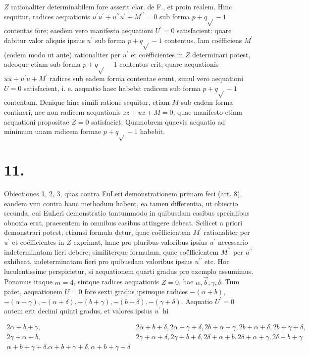 \documentclass[twoside,12pt, showframe]{memoir}
\begin{document}
\(Z\) rationaliter determinabilem fore asserit clar. de F., et proin realem. Hinc sequitur, radices aequationis \(u^{\prime} u^{\prime}+u^{\prime \prime} u^{\prime}+M^{\prime \prime}=0\) sub forma \(p+q \sqrt{ }-1\) contentas fore; eaedem vero manifesto aequationi \(U^{\prime}=0\) satisfacient: quare dabitur valor aliquis ipsius \(u^{\prime}\) sub forma \(p+q \sqrt{ }-1\) contentus. Iam coëfficiens \(M^{\prime}\) (eodem modo ut ante) rationaliter per \(u^{\prime}\) et coëfficientes in \(Z\) determinari potest, adeoque etiam sub forma \(p+q \sqrt{ }-1\) contentus erit; quare aequationis \(u u+u^{\prime} u+M^{\prime}\) radices sub eadem forma contentae erunt, simul vero aequationi \(U=0\) satisfacient, i. e. aequatio haec habebit radicem sub forma \(p+q \sqrt{ }-1\) contentam. Denique hinc simili ratione sequitur, etiam \(M\) sub eadem forma contineri, nec non radicem aequationis \(z z+u z+M=0\), quae manifesto etiam aequationi propositae \(Z=0\) satisfaciet. Quamobrem quaevis aequatio ad minimum unam radicem formae \(p+q \sqrt{ }-1\) habebit.

\section*{11.}
Obiectiones 1, 2, 3, quas contra EuLeri demonstrationem primam feci (art. 8), eandem vim contra hanc methodum habent, ea tamen differentia, ut obiectio secunda, cui EuLeri demonstratio tantummodo in quibusdam casibus specialibus obnoxia erat, praesentem in omnibus casibus attingere debeat. Scilicet a priori demonstrari potest, etiamsi formula detur, quae coëfficientem \(M^{\prime}\) rationaliter per \(u^{\prime}\) et coëfficientes in \(Z\) exprimat, hanc pro pluribus valoribus ipsius \(u^{\prime}\) necessario indeterminatam fieri debere; similiterque formulam, quae coëfficientem \(M^{\prime \prime}\) per \(u^{\prime \prime}\) exhibeat, indeterminatam fieri pro quibusdam valoribus ipsius \(u^{\prime \prime}\) etc. Hoc luculentissime perspicietur, si aequationem quarti gradus pro exemplo assumimus. Ponamus itaque \(m=4\), sintque radices aequationis \(Z=0\), hae \(\alpha, \vec{b}, \gamma, \delta\). Tum patet, aequationem \(U=0\) fore sexti gradus ipsiusque radices \(-(\alpha+b)\), \(-(\alpha+\gamma),-(\alpha+\delta),-(b+\gamma),-(b+\delta),-(\gamma+\delta)\). Aequatio \(U^{\prime}=0\) autem erit decimi quinti gradus, et valores ipsius \(u^{\prime}\) hi

\[
\begin{array}{cc}
2 \alpha+b+\gamma, & 2 \alpha+b+\delta, 2 \alpha+\gamma+\delta, 2 b+\alpha+\gamma, 2 b+\alpha+\delta, 2 b+\gamma+\delta, \\
2 \gamma+\alpha+b, & 2 \gamma+\alpha+\delta, 2 \gamma+b+\delta, 2 \delta+\alpha+b, 2 \delta+\alpha+\gamma, 2 \delta+b+\gamma \\
\alpha+b+\gamma+\delta . \alpha+b+\gamma+\delta, \alpha+b+\gamma+\delta
\end{array}
\]
\end{document}
